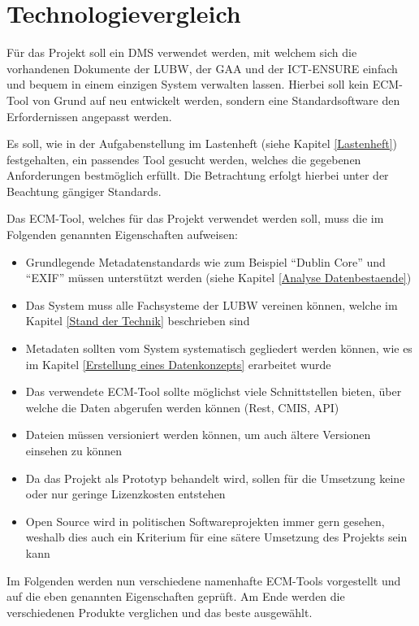 \section{Technologievergleich}\label{Technologievergleich}
F\"ur das Projekt soll ein \ac{DMS} verwendet werden, mit welchem sich die vorhandenen Dokumente der \ac{LUBW}, der \ac{GAA} und der \ac{ICT-ENSURE} einfach und bequem in einem einzigen System verwalten lassen. Hierbei soll kein \ac{ECM}-Tool von Grund auf neu entwickelt werden, sondern eine Standardsoftware den Erfordernissen angepasst werden. 

Es soll, wie in der Aufgabenstellung im Lastenheft (siehe Kapitel \ref{Lastenheft}) festgehalten, ein passendes Tool gesucht werden, welches die gegebenen Anforderungen bestm\"oglich erf\"ullt. Die Betrachtung erfolgt hierbei unter der Beachtung g\"angiger Standards.

Das \ac{ECM}-Tool, welches f\"ur das Projekt verwendet werden soll, muss die im Folgenden genannten Eigenschaften aufweisen:

\begin{itemize}
 \item Grundlegende Metadatenstandards wie zum Beispiel "`Dublin Core"' und "`EXIF"' m\"ussen unterst\"utzt werden (siehe Kapitel \ref{Analyse Datenbestaende})
 \item Das System muss alle Fachsysteme der \ac{LUBW} vereinen k\"onnen, welche im Kapitel \ref{Stand der Technik} beschrieben sind
 \item Metadaten sollten vom System systematisch gegliedert werden k\"onnen, wie es im Kapitel \ref{Erstellung eines Datenkonzepts} erarbeitet wurde
 \item Das verwendete \ac{ECM}-Tool sollte m\"oglichst viele Schnittstellen bieten, \"uber welche die Daten abgerufen werden k\"onnen (\ac{Rest}, \ac{CMIS}, \ac{API})
 \item Dateien m\"ussen versioniert werden k\"onnen, um auch \"altere Versionen einsehen zu k\"onnen
 \item Da das Projekt als Prototyp behandelt wird, sollen f\"ur die Umsetzung keine oder nur geringe Lizenzkosten entstehen
 \item Open Source wird in politischen Softwareprojekten immer gern gesehen, weshalb dies auch ein Kriterium f\"ur eine s\"atere Umsetzung des Projekts sein kann
\end{itemize}

Im Folgenden werden nun verschiedene namenhafte \ac{ECM}-Tools vorgestellt und auf die eben genannten Eigenschaften gepr\"uft. Am Ende werden die verschiedenen Produkte verglichen und das beste ausgew\"ahlt.


